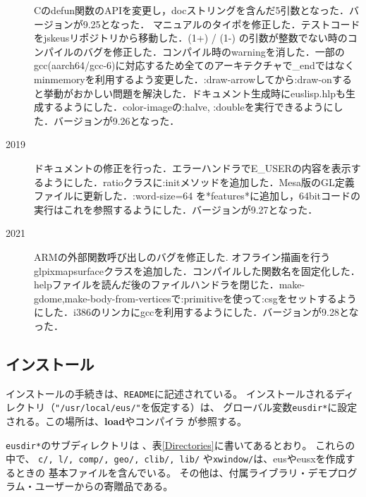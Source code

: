 \begin{description}
            Cのdefun関数のAPIを変更し，docストリングを含んだ5引数となった．バージョンが9.25となった．
            マニュアルのタイポを修正した．テストコードをjskeusリポジトリから移動した．(1+) / (1-) の引数が整数でない時のコンパイルのバグを修正した．コンパイル時のwarningを消した．一部のgcc(aarch64/gcc-6)に対応するため全てのアーキテクチャで\_endではなくminmemoryを利用するよう変更した．:draw-arrowしてから:draw-onすると挙動がおかしい問題を解決した．ドキュメント生成時にeuslisp.hlpも生成するようにした．color-imageの:halve, :doubleを実行できるようにした．バージョンが9.26となった．
\item[2019] ドキュメントの修正を行った．エラーハンドラでE\_USERの内容を表示するようにした．ratioクラスに:initメソッドを追加した．Mesa版のGL定義ファイルに更新した．:word-size=64 を*features*に追加し，64bitコードの実行はこれを参照するようにした．バージョンが9.27となった．
\item[2021] ARMの外部関数呼び出しのバグを修正した. オフライン描画を行うglpixmapsurfaceクラスを追加した．コンパイルした関数名を固定化した．helpファイルを読んだ後のファイルハンドラを閉じた．make-gdome,make-body-from-verticesで:primitiveを使って:csgをセットするようにした．i386のリンカにgccを利用するようにした．バージョンが9.28となった．
\end{description}

\subsection{インストール}
インストールの手続きは、{\tt README}に記述されている。
インストールされるディレクトリ（{\tt "/usr/local/eus/"}を仮定する）は、
グローバル変数{\tt *eusdir*}に設定される。この場所は、{\bf load}やコンパイラ
が参照する。

{\tt *eusdir*}のサブディレクトリは 、表\ref{Directories}に書いてあるとおり。
これらの中で、
{\tt c/, l/, comp/, geo/, clib/, lib/} や{\tt xwindow/}は、eusやeusxを作成するときの
基本ファイルを含んでいる。
その他は、付属ライブラリ・デモプログラム・ユーザーからの寄贈品である。

